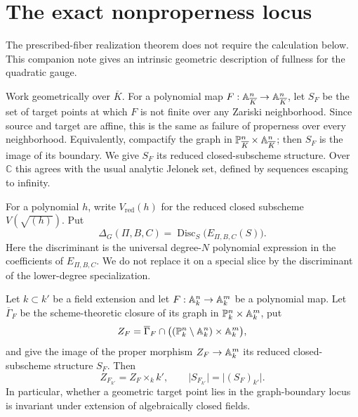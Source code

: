 \section{The exact nonproperness locus}
\label{sec:nonproperness}

The prescribed-fiber realization theorem does not require the calculation
below.  This companion note gives an intrinsic geometric description of
fullness for the quadratic gauge.

Work geometrically over
\(\overline K\).  For a polynomial map \(F:\mathbb A^n_{\overline K}\to
\mathbb A^n_{\overline K}\), let \(S_F\) be the set of target points at which \(F\)
is not finite over any Zariski neighborhood.  Since source and target are
affine, this is the same as failure of properness over every neighborhood.
Equivalently, compactify the graph in
\(\mathbb P^n_{\overline K}\times\mathbb A^n_{\overline K}\); then \(S_F\) is the
image of its boundary.  We give \(S_F\) its reduced closed-subscheme
structure.  Over \(\mathbb C\) this agrees with the usual analytic Jelonek
set, defined by sequences escaping to infinity.

For a polynomial \(h\), write \(V_{\mathrm{red}}(h)\) for the reduced closed
subscheme \(V(\sqrt{(h)})\).  Put
\begin{equation}
 \Delta_G(\Pi,B,C)
 =\operatorname{Disc}_S\bigl(E_{\Pi,B,C}(S)\bigr).
 \label{eq:gauge-discriminant}
\end{equation}
Here the discriminant is the universal degree-\(N\) polynomial expression in
the coefficients of \(E_{\Pi,B,C}\).  We do not replace it on a special
slice by the discriminant of the lower-degree specialization.

\begin{lemma}
\label{lem:nonfinite-base-change}
Let \(k\subset k'\) be a field extension and let
\(F:\mathbb A^n_k\to\mathbb A^m_k\) be a polynomial map.  Let \(\overline\Gamma_F\) be
the scheme-theoretic closure of its graph in
\(\mathbb P^n_k\times\mathbb A^m_k\), put
\[
 Z_F=\overline\Gamma_F\cap
 \bigl((\mathbb P^n_k\setminus\mathbb A^n_k)\times\mathbb A^m_k\bigr),
\]
and give the image of the proper morphism \(Z_F\to\mathbb A^m_k\) its reduced
closed-subscheme structure \(S_F\).  Then
\[
 Z_{F_{k'}}=Z_F\times_k k',
 \qquad
 \lvert S_{F_{k'}}\rvert=\lvert (S_F)_{k'}\rvert .
\]
In particular, whether a geometric target point lies in the graph-boundary
locus is invariant under extension of algebraically closed fields.
\end{lemma}

